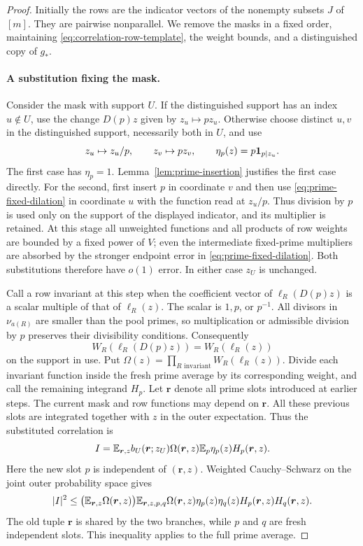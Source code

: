 \begin{proof}
Initially the rows are the indicator vectors of the nonempty subsets
$J$ of $[m]$.  They are pairwise nonparallel.  We remove the masks in a
fixed order, maintaining \eqref{eq:correlation-row-template}, the weight
bounds, and a distinguished copy of $g_*$.

\paragraph{A substitution fixing the mask.}
Consider the mask with support $U$.  If the distinguished support has
an index $u\notin U$, use the change $D(p)z$ given by
$z_u\mapsto pz_u$.  Otherwise choose distinct $u,v$ in the distinguished
support, necessarily both in $U$, and use
\begin{equation}
 z_u\mapsto z_u/p,\qquad z_v\mapsto pz_v,
 \qquad \eta_p(z)=p\mathbf 1_{p\mid z_u}.
 \label{eq:balanced-prime-substitution}
\end{equation}
The first case has $\eta_p=1$.
Lemma~\ref{lem:prime-insertion} justifies the first case directly.
For the second, first insert $p$ in coordinate $v$ and then use
\eqref{eq:prime-fixed-dilation} in coordinate $u$ with the function
read at $z_u/p$.  Thus division by $p$ is used only on the support of
the displayed indicator, and its multiplier is retained.  At this
stage all unweighted functions and all products of row weights are
bounded by a fixed power of $V$; even the intermediate fixed-prime
multipliers are absorbed by the stronger endpoint error in
\eqref{eq:prime-fixed-dilation}.  Both substitutions therefore have
$o(1)$ error.  In either case $z_U$ is unchanged.

Call a row invariant at this step when the coefficient vector of
$\ell_R(D(p)z)$ is a scalar multiple of that of $\ell_R(z)$.
The scalar is $1,p$, or $p^{-1}$.  All divisors in $\nu_{a(R)}$ are
smaller than the pool primes, so multiplication or admissible division
by $p$ preserves their divisibility conditions.  Consequently
\[
 W_R(\ell_R(D(p)z))=W_R(\ell_R(z))
\]
on the support in use.  Put
$\Omega(z)=\prod_{R\text{ invariant}}W_R(\ell_R(z))$.
Divide each invariant function inside the fresh prime average by its
corresponding weight, and call the remaining integrand $H_p$.
Let $\boldsymbol r$ denote all prime slots introduced at earlier steps.
The current mask and row functions may depend on $\boldsymbol r$.
All these previous slots are integrated together with $z$ in the outer
expectation. Thus the substituted correlation is
\[
 I=\mathbb E_{\boldsymbol r,z}
 b_U(\boldsymbol r;z_U)\Omega(\boldsymbol r,z)
       \mathbb E_p\eta_p(z)H_p(\boldsymbol r,z).
\]
Here the new slot $p$ is independent of $(\boldsymbol r,z)$.
Weighted Cauchy--Schwarz on the joint outer probability space gives
\begin{equation}
 |I|^2\le
 \bigl(\mathbb E_{\boldsymbol r,z}\Omega(\boldsymbol r,z)\bigr)
 \mathbb E_{\boldsymbol r,z,p,q}
 \Omega(\boldsymbol r,z)\eta_p(z)\eta_q(z)
 H_p(\boldsymbol r,z)H_q(\boldsymbol r,z).
 \label{eq:mask-weighted-cs}
\end{equation}
The old tuple $\boldsymbol r$ is shared by the two branches, while $p$
and $q$ are fresh independent slots. This inequality applies to the
full prime average.


\end{proof}
